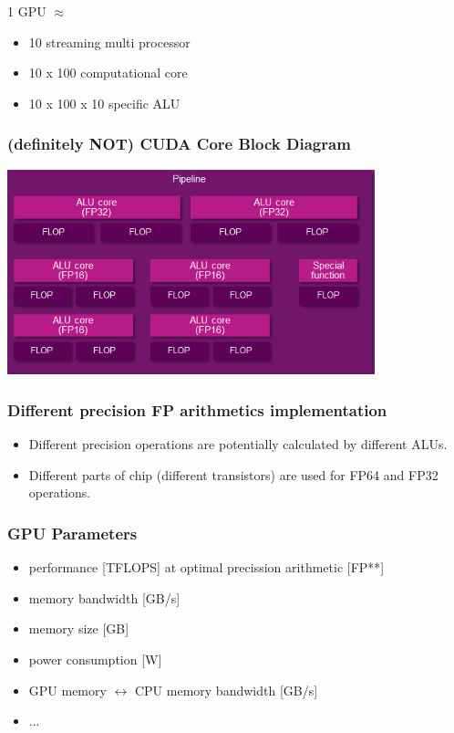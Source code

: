 \documentclass{beamer}
\begin{document}
			\begin{frame}
				1 GPU $\approx$
				\begin{itemize}
					\item 10 streaming multi processor
					\item 10 x 100 computational core
					\item 10 x 100 x 10 specific ALU
				\end{itemize}
			\end{frame}
            			
            \begin{frame}
				\frametitle{(definitely NOT) CUDA Core Block Diagram}
				\includegraphics[width=0.8\textwidth]{IMGPipeline.png}
			\end{frame}
            
			\begin{frame}
				\frametitle{Different precision FP arithmetics implementation}
				\begin{itemize} 
					\item Different precision operations are potentially calculated by different ALUs.
					\item Different parts of chip (different transistors) are used for FP64 and FP32 operations.
				\end{itemize} 
			\end{frame}	
            
			\begin{frame}
				\frametitle{GPU Parameters}
				\begin{itemize}
					\item performance [TFLOPS] at optimal precission arithmetic [FP**]
                    \item memory bandwidth [GB/s]
					\item memory size [GB]
					\item power consumption [W]
					\item GPU memory $\leftrightarrow$ CPU memory bandwidth [GB/s]
					\item ...
				\end{itemize}
			\end{frame}
			
\end{document}
